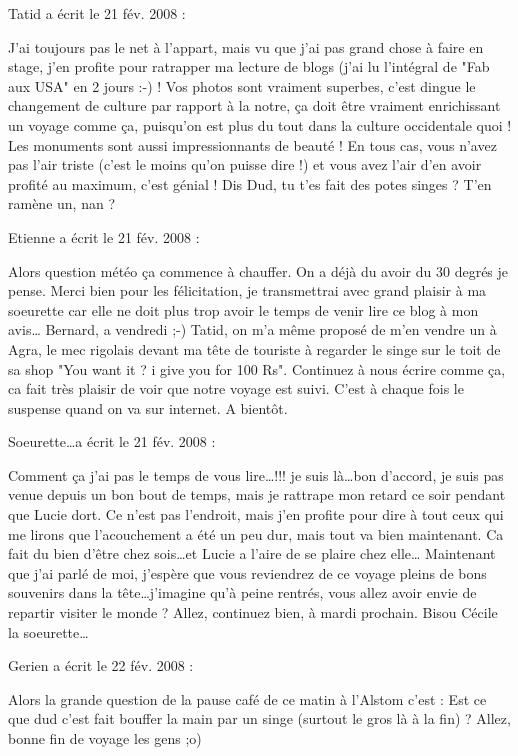 \medskip
Tatid a écrit le 21 fév. 2008 :
\begin{displayquote}
J'ai toujours pas le net à l'appart, mais vu que j'ai pas grand chose à faire en stage, j'en profite pour ratrapper ma lecture de blogs (j'ai lu l'intégral de "Fab aux USA" en 2 jours :-) !
Vos photos sont vraiment superbes, c'est dingue le changement de culture par rapport à la notre, ça doit être vraiment enrichissant un voyage comme ça, puisqu'on est plus du tout dans la culture occidentale quoi ! Les monuments sont aussi impressionnants de beauté ! En tous cas, vous n'avez pas l'air triste (c'est le moins qu'on puisse dire !) et vous avez l'air d'en avoir profité au maximum, c'est génial !
Dis Dud, tu t'es fait des potes singes ? T'en ramène un, nan ?
\end{displayquote}

\medskip
Etienne a écrit le 21 fév. 2008 :
\begin{displayquote}
Alors question météo ça commence à chauffer. On a déjà du avoir du 30 degrés je pense. Merci bien pour les félicitation, je transmettrai avec grand plaisir à ma soeurette car elle ne doit plus trop avoir le temps de venir lire ce blog à mon avis\dots
Bernard, a vendredi ;-)
Tatid, on m'a même proposé de m'en vendre un à Agra, le mec rigolais devant ma tête de touriste à regarder le singe sur le toit de sa shop "You want it ? i give you for 100 Rs".
Continuez à nous écrire comme ça, ca fait très plaisir de voir que notre voyage est suivi. C'est à chaque fois le suspense quand on va sur internet. A bientôt.
\end{displayquote}

\medskip
Soeurette\dots a écrit le 21 fév. 2008 :
\begin{displayquote}
Comment ça j'ai pas le temps de vous lire\dots !!! je suis là\dots bon d'accord, je suis pas venue depuis un bon bout de temps, mais je rattrape mon retard ce soir pendant que Lucie dort.
Ce n'est pas l'endroit, mais j'en profite pour dire à tout ceux  qui me lirons que l'acouchement a été un peu dur, mais tout va bien maintenant. Ca fait du bien d'être chez sois\dots et Lucie a l'aire de se plaire chez elle\dots
Maintenant que j'ai parlé de moi, j'espère que vous reviendrez de ce voyage pleins de bons souvenirs dans la tête\dots j'imagine qu'à peine rentrés, vous allez avoir envie de repartir visiter le monde ?
Allez, continuez bien, à mardi prochain.
Bisou
Cécile la soeurette\dots
\end{displayquote}

\medskip
Gerien a écrit le 22 fév. 2008 :
\begin{displayquote}
Alors la grande question de la pause café de ce matin à l'Alstom c'est :
Est ce que dud c'est fait bouffer la main par un singe (surtout le gros là à la fin) ?
Allez, bonne fin de voyage les gens ;o)
\end{displayquote}

